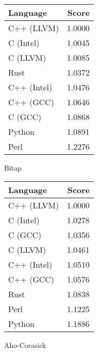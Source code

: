 \begin{subtable}{0.33\textwidth}
    \centering
    \begin{tabular}{|l|r|}
        \hline
        Language & Score \\
        \hline
        C++ (LLVM) & 1.0000 \\
        C (Intel) & 1.0045 \\
        C (LLVM) & 1.0085 \\
        Rust & 1.0372 \\
        C++ (Intel) & 1.0476 \\
        C++ (GCC) & 1.0646 \\
        C (GCC) & 1.0868 \\
        Python & 1.0891 \\
        Perl & 1.2276 \\
        \hline
    \end{tabular}
    \caption{Bitap}
    \label{table:energy:shift_or}
\end{subtable}
\begin{subtable}{0.33\textwidth}
    \centering
    \begin{tabular}{|l|r|}
        \hline
        Language & Score \\
        \hline
        C++ (LLVM) & 1.0000 \\
        C (Intel) & 1.0278 \\
        C (GCC) & 1.0356 \\
        C (LLVM) & 1.0461 \\
        C++ (Intel) & 1.0510 \\
        C++ (GCC) & 1.0576 \\
        Rust & 1.0838 \\
        Perl & 1.1225 \\
        Python & 1.1886 \\
        \hline
    \end{tabular}
    \caption{Aho-Corasick}
    \label{table:energy:aho_corasick}
\end{subtable}%

